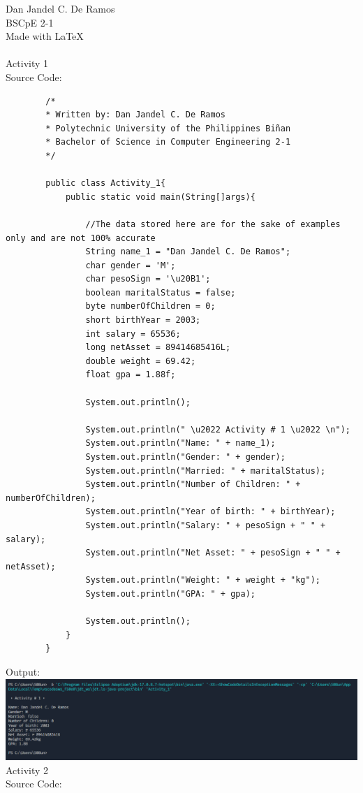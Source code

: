 \documentclass[12pt]{article}
\begin{document}
 
	\noindent
	Dan Jandel C. De Ramos\\
	BSCpE 2-1\\
	Made with \LaTeX \\
	\\
	Activity 1\\
	Source Code:
	
	\begin{verbatim}         
		/*
		* Written by: Dan Jandel C. De Ramos
		* Polytechnic University of the Philippines Biñan
		* Bachelor of Science in Computer Engineering 2-1
		*/
		
		public class Activity_1{
			public static void main(String[]args){         
				
				//The data stored here are for the sake of examples only and are not 100% accurate        
				String name_1 = "Dan Jandel C. De Ramos";        
				char gender = 'M';
				char pesoSign = '\u20B1';
				boolean maritalStatus = false;
				byte numberOfChildren = 0;
				short birthYear = 2003;
				int salary = 65536;  
				long netAsset = 89414685416L;
				double weight = 69.42;
				float gpa = 1.88f;
				
				System.out.println();
				
				System.out.println(" \u2022 Activity # 1 \u2022 \n");
				System.out.println("Name: " + name_1);
				System.out.println("Gender: " + gender);
				System.out.println("Married: " + maritalStatus);
				System.out.println("Number of Children: " + numberOfChildren);
				System.out.println("Year of birth: " + birthYear);
				System.out.println("Salary: " + pesoSign + " " + salary);
				System.out.println("Net Asset: " + pesoSign + " " + netAsset);
				System.out.println("Weight: " + weight + "kg");
				System.out.println("GPA: " + gpa);       
				
				System.out.println();        
			}
		}
	\end{verbatim}
	\clearpage
	\noindent
	Output:\\
	\includegraphics[width=\textwidth]{output1}
	\clearpage
	\noindent
	Activity 2\\
	Source Code:
	
\end{document}
